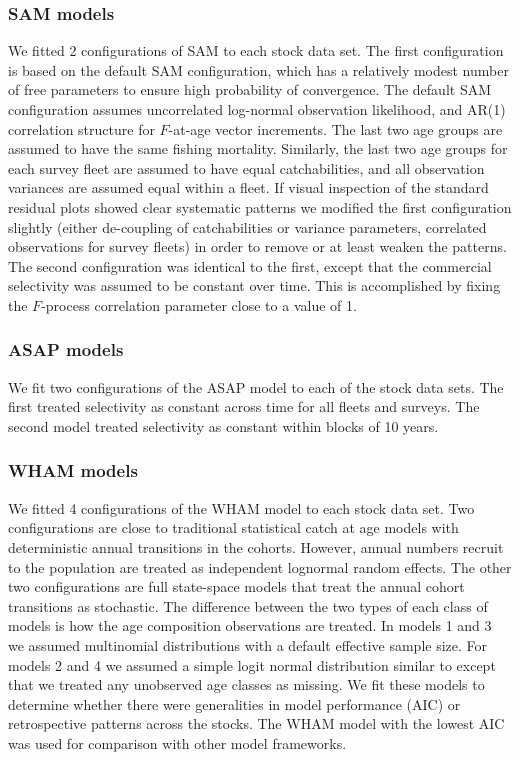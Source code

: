 \documentclass[12pt,letterpaper, leqno]{article}
\begin{document}
\subsubsection*{SAM models}

We fitted 2 configurations of SAM to each stock data set. The first configuration is based on the default SAM configuration, which has a relatively modest number of free parameters to ensure high probability of convergence. The default SAM configuration assumes uncorrelated log-normal observation likelihood, and AR(1) correlation structure for $F$-at-age vector increments. The last two age groups are assumed to have the same fishing mortality. Similarly, the last two age groups for each survey fleet are assumed to have equal catchabilities, and all observation variances are assumed equal within a fleet. If visual inspection of the standard residual plots showed clear systematic patterns we modified the first configuration slightly (either de-coupling of catchabilities or variance parameters, correlated observations for survey fleets) in order to remove or at least weaken the patterns.
The second configuration was identical to the first, except that the commercial selectivity was assumed to be constant over time. This is accomplished by fixing the $F$-process correlation parameter close to a value of 1.

\subsubsection*{ASAP models}

We fit two configurations of the ASAP model to each of the stock data sets. The first treated selectivity as constant across time for all fleets and surveys. The second model treated selectivity as constant within blocks of 10 years.

\subsubsection*{WHAM models}

We fitted 4 configurations of the WHAM model to each stock data set. Two configurations are close to traditional statistical catch at age models with deterministic annual transitions in the cohorts. However, annual numbers recruit to the population are treated as independent lognormal random effects. The other two configurations are full state-space models that treat the annual cohort transitions as stochastic. The difference between the two types of each class of models is how the age composition observations are treated. In models 1 and 3 we assumed multinomial distributions with a default effective sample size. For models 2 and 4 we assumed a simple logit normal distribution similar to \citet{milleretal16} except that we treated any unobserved age classes as missing. We fit these models to determine whether there were generalities in model performance (AIC) or retrospective patterns across the stocks. The WHAM model with the lowest AIC was used for comparison with other model frameworks.
\end{document}

